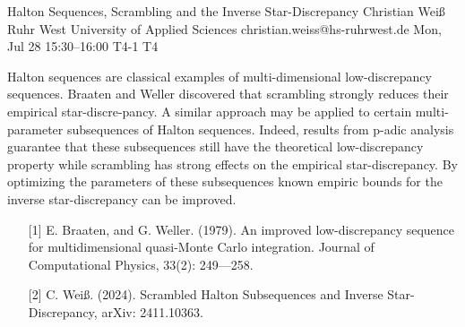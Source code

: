 \begin{talk}
  {Halton Sequences, Scrambling and the Inverse Star-Discrepancy}%
  {Christian Wei\ss{}}%
  {Ruhr West University of Applied Sciences}%
  {christian.weiss@hs-ruhrwest.de}%
  {}%
  {}%
  {Mon, Jul 28 15:30–16:00}%
  {T4-1}%
  {T4}%
  {}%
  
				
			
Halton sequences are classical examples of multi-dimensional low-discrepancy sequences. Braaten and Weller discovered that scrambling strongly reduces their empirical star-discre-pancy. A similar approach may be applied to certain multi-parameter subsequences of Halton sequences. Indeed, results from p-adic analysis guarantee that these subsequences still have the theoretical low-discrepancy property while scrambling has strong effects on the empirical star-discrepancy. By optimizing the parameters of these subsequences known empiric bounds for the inverse star-discrepancy can be improved.

\medskip


\begin{enumerate}
	\item[{[1]}] E. Braaten, and G. Weller. (1979). An improved low-discrepancy sequence for multidimensional quasi-Monte Carlo integration. Journal of Computational Physics, 33(2): 249---258.
	\item[{[2]}] C. Wei\ss{}. (2024). Scrambled Halton Subsequences and Inverse Star-Discrepancy, arXiv: 2411.10363. 
\end{enumerate}

\end{talk}

